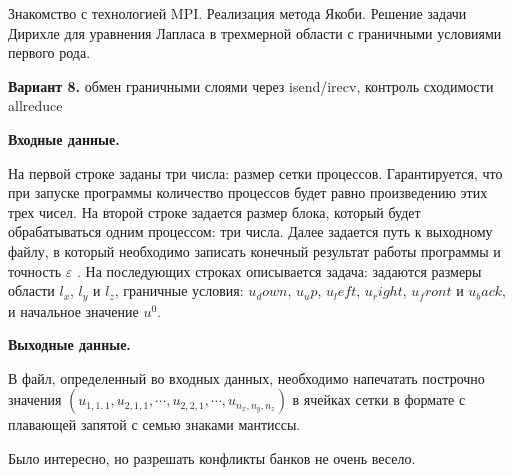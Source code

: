 \documentclass[12pt]{article}
\begin{document}


Знакомство с технологией MPI. Реализация метода Якоби.
Решение задачи Дирихле для уравнения Лапласа в трехмерной области с граничными
условиями первого рода.

\textbf{Вариант 8.} обмен граничными слоями через isend/irecv, контроль сходимости allreduce

\textbf{Входные данные.}

На первой строке заданы три числа: размер сетки
процессов. Гарантируется, что при запуске программы количество процессов будет
равно произведению этих трех чисел. На второй строке задается размер блока,
который будет обрабатываться одним процессом: три числа. Далее задается путь к
выходному файлу, в который необходимо записать конечный результат работы
программы и точность $\varepsilon$ . На последующих строках описывается задача: задаются
размеры области $l_x$, $l_y$ и $l_z$,
граничные условия: $u_down$, $u_up$, $u_left$, $u_right$, $u_front$ и $u_back$,
и начальное значение $u^0$.

\textbf{Выходные данные.}

В файл, определенный во входных данных, необходимо
напечатать построчно значения $(u_{1,1,1}, u_{2,1,1}, \cdots, u_{2,2,1}, \cdots, u_{n_x,n_y,n_z})$
в ячейках сетки в формате с плавающей запятой с семью знаками мантиссы.

\nvidia






Было интересно, но разрешать конфликты банков не очень весело.
\end{document}
